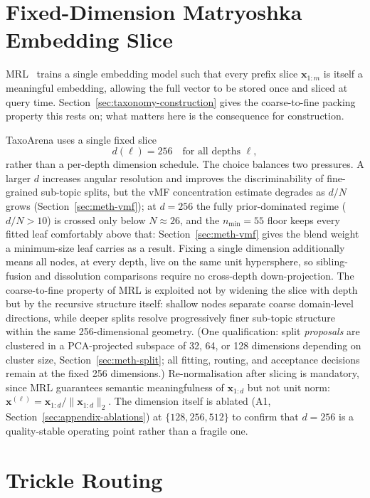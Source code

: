 \section{Fixed-Dimension Matryoshka Embedding Slice}\label{sec:meth-mrl}\label{subsec:dim-schedule}

MRL~\parencite{kusupati2022mrl} trains a single embedding model such
that every prefix slice $\mathbf{x}_{1:m}$ is itself a meaningful
embedding, allowing the full vector to be stored once and sliced at
query time.
Section~\ref{sec:taxonomy-construction} gives the coarse-to-fine
packing property this rests on; what matters here is the consequence
for construction.

TaxoArena uses a single fixed slice
\[
d(\ell) = 256 \quad \text{for all depths } \ell,
\]
rather than a per-depth dimension schedule.
The choice balances two pressures.
A larger $d$ increases angular resolution and improves the
discriminability of fine-grained sub-topic splits, but the vMF
concentration estimate degrades as $d/N$ grows
(Section~\ref{sec:meth-vmf}); at $d = 256$ the fully prior-dominated
regime ($d/N > 10$) is crossed only below $N \approx
26$, and the $n_{\min} = 55$ floor keeps every fitted leaf comfortably
above that: Section~\ref{sec:meth-vmf} gives the blend
weight a minimum-size leaf carries as a result.
Fixing a single dimension additionally means all nodes, at every
depth, live on the same unit hypersphere, so sibling-fusion and
dissolution comparisons require no cross-depth
down-projection.
The coarse-to-fine property of MRL is exploited not by widening the
slice with depth but by the recursive structure itself: shallow nodes
separate coarse domain-level directions, while deeper splits resolve
progressively finer sub-topic structure within the same 256-dimensional
geometry.
(One qualification: split \emph{proposals} are clustered in a
PCA-projected subspace of 32, 64, or 128 dimensions depending on
cluster size, Section~\ref{sec:meth-split}; all fitting, routing, and
acceptance decisions remain at the fixed 256 dimensions.)
Re-normalisation after slicing is mandatory, since MRL guarantees
semantic meaningfulness of $\mathbf{x}_{1:d}$ but not unit norm:
\(
\mathbf{x}^{(\ell)}
= \mathbf{x}_{1:d} / \|\mathbf{x}_{1:d}\|_2.
\)
The dimension itself is ablated (A1, Section~\ref{sec:appendix-ablations})
at $\{128, 256, 512\}$ to confirm that $d = 256$ is a
quality-stable operating point rather than a fragile one.

\section{Trickle Routing}\label{sec:meth-routing}

